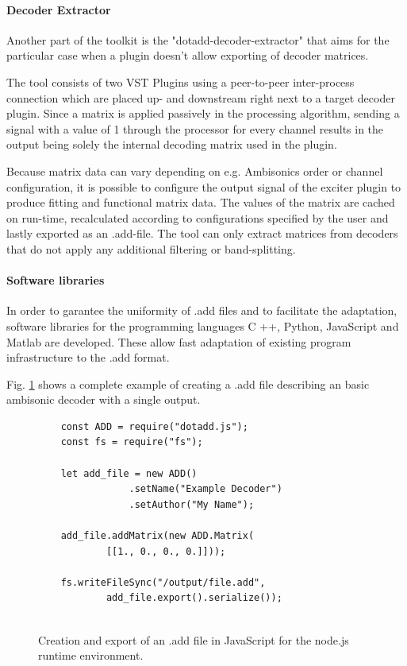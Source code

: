 \documentclass[a4paper, 10pt, twocolumn]{article}
\begin{document}

\paragraph{Decoder Extractor}
Another part of the toolkit is the "dotadd-decoder-extractor" that aims for the particular case when a plugin doesn't allow exporting of decoder matrices.

The tool consists of two VST Plugins using a peer-to-peer inter-process connection which are placed up- and downstream right next to a target decoder plugin. Since a matrix is applied passively in the processing algorithm, sending a signal with a value of 1 through the processor for every channel results in the output being solely the internal decoding matrix used in the plugin. 

Because matrix data can vary depending on e.g. Ambisonics order or channel configuration, it is possible to configure the output signal of the exciter plugin to produce fitting and functional matrix data. The values of the matrix are cached on run-time, recalculated according to configurations specified by the user and lastly exported as an .add-file. The tool can only extract matrices from decoders that do not apply any additional filtering or band-splitting.

\paragraph{Software libraries}

In order to garantee the uniformity of .add files and to facilitate the adaptation, software libraries for the programming languages C ++, Python, JavaScript and Matlab are developed. These allow fast adaptation of existing program infrastructure to the .add format.

Fig. \ref{fig:dotadd} shows a complete example of creating a .add file describing an basic ambisonic decoder with a single output.

\vspace{3mm}
\begin{figure}[htb]
\begin{lstlisting}
    const ADD = require("dotadd.js");
    const fs = require("fs");
    
    let add_file = new ADD()
                .setName("Example Decoder")
                .setAuthor("My Name");
    
    add_file.addMatrix(new ADD.Matrix(
            [[1., 0., 0., 0.]]));
    
    fs.writeFileSync("/output/file.add", 
            add_file.export().serialize());
    
    \end{lstlisting}
\caption{Creation and export of an .add file in JavaScript for the node.js runtime environment.}\label{fig:dotadd}
\end{figure}
\vspace{2mm}
\end{document}
